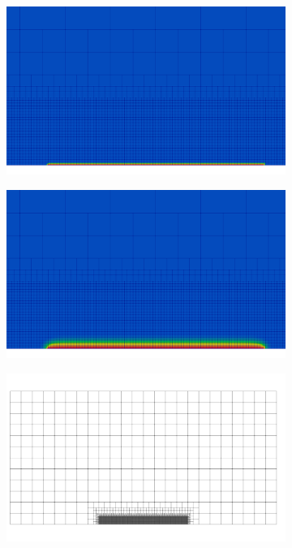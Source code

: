\begin{figure}[htbp!]
  \centering
  \begin{subfigure}[t]{0.46\linewidth}
    \centering
    \includegraphics[width=\linewidth]{Chapter3/figures/sneddon_c0}
    \caption{}
    \label{fig:sneddon_c0}
  \end{subfigure}
  \begin{subfigure}[t]{0.46\linewidth}
    \centering
    \includegraphics[width=\linewidth]{Chapter3/figures/sneddon_c1}
    \caption{}
    \label{fig:sneddon_c1}
  \end{subfigure}
  \begin{subfigure}[t]{0.475\linewidth}
    \centering
    \includegraphics[width=\linewidth]{Chapter3/figures/sneddon_mesh}

\end{subfigure}
\end{figure}
